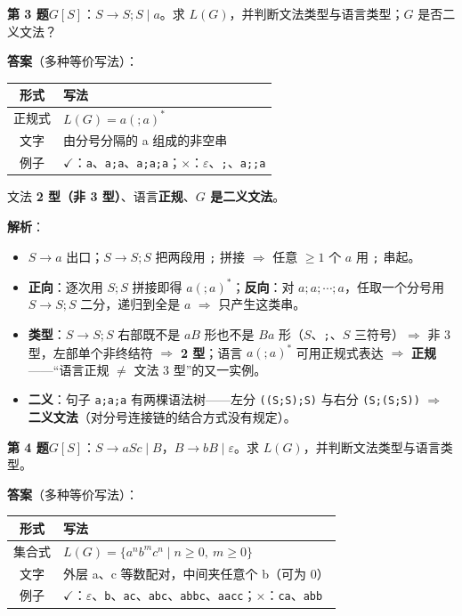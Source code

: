 \documentclass[12pt,a4paper,fontset=windows]{ctexart}
\newcommand{\ok}{\ensuremath{\checkmark}}
\newcommand{\bad}{\ensuremath{\times}}
\newcommand{\imp}{\ensuremath{\Rightarrow}}
\begin{document}
\begin{qbox}
{\large\bfseries 第 3 题}\quad $G[S]$：$S \to S;S \mid a$。求 $L(G)$，并判断文法类型与语言类型；$G$ 是否二义文法？
\end{qbox}

\textbf{答案}（多种等价写法）：

\begin{center}
\renewcommand{\arraystretch}{1.25}
\begin{tabular}{c p{11.2cm}}
\toprule
\textbf{形式} & \textbf{写法} \\
\midrule
正规式 & $L(G)=a( ; a)^*$ \\
文字 & 由分号分隔的 a 组成的非空串 \\
例子 & \ok：\texttt{a}、\texttt{a;a}、\texttt{a;a;a}；\bad：$\varepsilon$、\texttt{;}、\texttt{a;;a} \\
\bottomrule
\end{tabular}
\end{center}

文法 \textbf{2 型（非 3 型）}、语言\textbf{正规}、\textbf{$G$ 是二义文法}。

\textbf{解析}：
\begin{itemize}
\item $S \to a$ 出口；$S \to S;S$ 把两段用 \texttt{;} 拼接 \imp{} 任意 $\ge 1$ 个 $a$ 用 \texttt{;} 串起。
\item \textbf{正向}：逐次用 $S;S$ 拼接即得 $a( ; a)^*$；\textbf{反向}：对 $a;a;\cdots;a$，任取一个分号用 $S \to S;S$ 二分，递归到全是 $a$ \imp{} 只产生这类串。
\item \textbf{类型}：$S \to S;S$ 右部既不是 $aB$ 形也不是 $Ba$ 形（$S$、\texttt{;}、$S$ 三符号）\imp{} 非 3 型，左部单个非终结符 \imp{} \textbf{2 型}；语言 $a( ; a)^*$ 可用正规式表达 \imp{} \textbf{正规}——``语言正规 $\ne$ 文法 3 型''的又一实例。
\item \textbf{二义}：句子 \texttt{a;a;a} 有两棵语法树——左分 \texttt{((S;S);S)} 与右分 \texttt{(S;(S;S))} \imp{} \textbf{二义文法}（对分号连接链的结合方式没有规定）。
\end{itemize}

\begin{qbox}
{\large\bfseries 第 4 题}\quad $G[S]$：$S \to aSc \mid B$，$B \to bB \mid \varepsilon$。求 $L(G)$，并判断文法类型与语言类型。
\end{qbox}

\textbf{答案}（多种等价写法）：

\begin{center}
\renewcommand{\arraystretch}{1.25}
\begin{tabular}{c p{11.2cm}}
\toprule
\textbf{形式} & \textbf{写法} \\
\midrule
集合式 & $L(G)=\{a^n b^m c^n \mid n \ge 0,\ m \ge 0\}$ \\
文字 & 外层 a、c 等数配对，中间夹任意个 b（可为 0） \\
例子 & \ok：$\varepsilon$、\texttt{b}、\texttt{ac}、\texttt{abc}、\texttt{abbc}、\texttt{aacc}；\bad：\texttt{ca}、\texttt{abb} \\
\bottomrule
\end{tabular}
\end{center}
\end{document}
